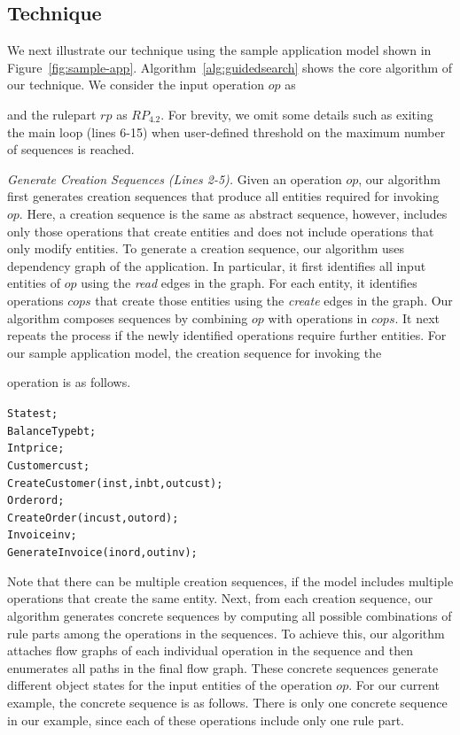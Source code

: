 \subsection{Technique}
\label{sec:technique}

We next illustrate our technique using the sample application model shown in Figure~\ref{fig:sample-app}.
Algorithm~\ref{alg:guidedsearch} shows the core algorithm of our technique. We consider
the input operation $op$ as \subject{GenerateInvoice} and the rulepart $rp$ as $RP_{4.2}$.
For brevity,
we omit some details such as exiting the main loop (lines 6-15) when user-defined
threshold on the maximum number of sequences is reached.

\textit{Generate Creation Sequences (Lines 2-5).} Given an operation $op$, our algorithm
first generates creation sequences that produce all entities required for invoking $op$.
Here, a creation sequence is the same as abstract sequence, however, includes only those
operations that create entities and does not include operations that only modify
entities. To generate a creation sequence, our algorithm uses dependency graph of the application.
In particular, it first identifies all input entities of $op$ using the \textit{read}
edges in the graph. For each entity, it identifies operations $cops$ that create those entities
using the \textit{create} edges in the graph. Our algorithm composes sequences by combining
$op$ with operations in $cops$. It next repeats the process if the newly identified
operations require further entities. For our sample application model, the creation sequence for invoking 
the \subject{GenerateInvoice} operation is as follows.

\vspace*{-5pt}
{\small
\begin{alltt}
  State st;
  BalanceType bt;
  Int price;
  Customer cust;
  CreateCustomer(in st,in bt, out cust);
  Order ord;
  CreateOrder(in cust, out ord);	
  Invoice inv;
  GenerateInvoice(in ord, out inv);  
\end{alltt}
}
\vspace*{-5pt}

Note that there can be multiple creation sequences, if the model includes multiple operations
that create the same entity. Next, from each creation sequence,
our algorithm generates concrete sequences by computing all possible combinations of
rule parts among the operations in the sequences. To achieve this, our algorithm
attaches flow graphs of each individual operation in the sequence and then
enumerates all paths in the final flow graph. These concrete sequences generate different
object states for the input entities of the operation $op$. For our current example,
the concrete sequence is as follows. There is only one concrete sequence in our example,
since each of these operations include only one rule part.

